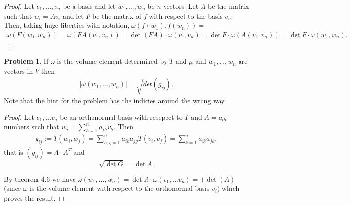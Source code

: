 \documentclass[20pt]{article}
\theoremstyle{plain}
\theoremstyle{definition}
\newtheorem*{problem}{Problem}
\begin{document}
  \begin{proof}
    Let $v_1, ..., v_n$ be a basis and let $w_1, ..., w_n$ be $n$ vectors.
    Let $A$ be the matrix such that $w_i = Av_i$ and let $F$ be the matrix 
    of $f$ with respect to the basis $v_i$.  Then, taking huge liberties with 
    notation, $\omega(f(w_1), f(w_n)) = $
    \begin{align*}
      \omega(F(w_1,w_n)) = 
      \omega(FA(v_1,v_n)) = 
      \det(FA)\cdot \omega(v_1, v_n) = 
      \det F \cdot \omega(A(v_1, v_n)) = 
      \det F \cdot \omega(w_1, w_n).
    \end{align*}
  \end{proof}


  \begin{problem}{4.3}
    If $\omega$ is the volume element determined by $T$ and $\mu$ and $w_1, ..., w_n$ are vectors in $V$ then 
    \begin{align*}
      |\omega(w_1, ..., w_n)| = \sqrt{det(g_{ij})}.
    \end{align*}    
    Note that the hint for the problem has the indicies around the wrong way.
  \end{problem}
  \begin{proof}
    Let $v_1, ...v_n$ be an orthonormal basis with resepect to $T$ and $A = a_{ih}$ numbers such that 
    $w_i = \sum_{h=1}^n a_{ih}v_h$.
    Then 
    \begin{align*}
      g_{ij} := T(w_i, w_j) = \sum_{h,g=1}^n a_{ih}a_{jg}T(v_i, v_j) = \sum_{k=1}^n a_{ik}a_{jk},
    \end{align*}
    that is $(g_{ij}) = A\cdot A^T$ and
    $$\sqrt{\det G} = \det A.$$

    By theorem 4.6 we have 
    $ \omega(w_1, ..., w_n) = \det A \cdot \omega(v_1, ...v_n) = \pm \det(A)$
    (since $\omega$ is the volume element with respect to the orthonormal basis $v_i$) which proves the result.
  \end{proof}
\end{document}
